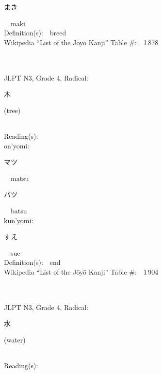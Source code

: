 \begin{multicols}{2}
{\hspace*{2em}}{\begin{CJK}{UTF8}{min} まき \end{CJK}}\ \ maki\ \ \\
Definition(s):\ \ breed \\
Wikipedia ``List of the J\=oy\=o Kanji'' Table \#:\ \ 1\,878 \\
\ \ \\
{\fontsize{34pt}{40pt}  }\ \ \\  %
{JLPT N3, Grade 4, Radical:\ \ {\begin{CJK}{UTF8}{min} 木 \end{CJK}} (tree) } \\
Reading(s):\ \ \\
{\hspace*{1em}}on'yomi:\ \ \\
{\hspace*{2em}}{\begin{CJK}{UTF8}{min} マツ \end{CJK}}\ \ matsu\ \ \\
{\hspace*{2em}}{\begin{CJK}{UTF8}{min} バツ \end{CJK}}\ \ batsu\ \ \\
{\hspace*{1em}}kun'yomi:\ \ \\
{\hspace*{2em}}{\begin{CJK}{UTF8}{min} すえ \end{CJK}}\ \ sue\ \ \\
Definition(s):\ \ end \\
Wikipedia ``List of the J\=oy\=o Kanji'' Table \#:\ \ 1\,904 \\
\ \ \\
{\fontsize{34pt}{40pt}  }\ \ \\  %
{JLPT N3, Grade 4, Radical:\ \ {\begin{CJK}{UTF8}{min} 水 \end{CJK}} (water) } \\
Reading(s):\ \ \\

\end{multicols}
